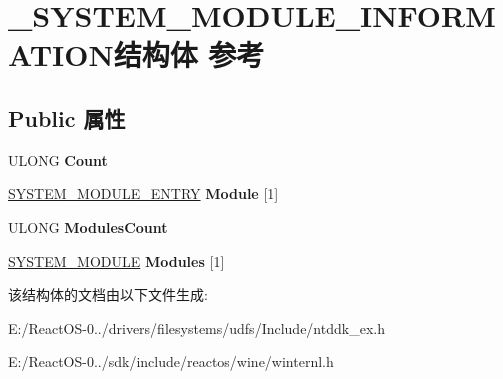 \hypertarget{struct___s_y_s_t_e_m___m_o_d_u_l_e___i_n_f_o_r_m_a_t_i_o_n}{}\section{\+\_\+\+S\+Y\+S\+T\+E\+M\+\_\+\+M\+O\+D\+U\+L\+E\+\_\+\+I\+N\+F\+O\+R\+M\+A\+T\+I\+O\+N结构体 参考}
\label{struct___s_y_s_t_e_m___m_o_d_u_l_e___i_n_f_o_r_m_a_t_i_o_n}
\subsection*{Public 属性}
\begin{DoxyCompactItemize}
\item 
\mbox{\label{struct___s_y_s_t_e_m___m_o_d_u_l_e___i_n_f_o_r_m_a_t_i_o_n_a2364a25229c26e8e7ca48a794c7d2bf2}} 
U\+L\+O\+NG {\bfseries Count}
\item 
\mbox{\label{struct___s_y_s_t_e_m___m_o_d_u_l_e___i_n_f_o_r_m_a_t_i_o_n_aa17ccbc5df4938996b20df197d03bd10}} 
\hyperlink{struct___s_y_s_t_e_m___m_o_d_u_l_e___e_n_t_r_y}{S\+Y\+S\+T\+E\+M\+\_\+\+M\+O\+D\+U\+L\+E\+\_\+\+E\+N\+T\+RY} {\bfseries Module} \mbox{[}1\mbox{]}
\item 
\mbox{\label{struct___s_y_s_t_e_m___m_o_d_u_l_e___i_n_f_o_r_m_a_t_i_o_n_a33af147d26d3425d850544dedf20220b}} 
U\+L\+O\+NG {\bfseries Modules\+Count}
\item 
\mbox{\label{struct___s_y_s_t_e_m___m_o_d_u_l_e___i_n_f_o_r_m_a_t_i_o_n_a2e33e4e1e81eb3c903eacb0ecf549cce}} 
\hyperlink{struct___s_y_s_t_e_m___m_o_d_u_l_e}{S\+Y\+S\+T\+E\+M\+\_\+\+M\+O\+D\+U\+LE} {\bfseries Modules} \mbox{[}1\mbox{]}
\end{DoxyCompactItemize}


该结构体的文档由以下文件生成\+:\begin{DoxyCompactItemize}
\item 
E\+:/\+React\+O\+S-\/0../drivers/filesystems/udfs/\+Include/ntddk\+\_\+ex.\+h\item 
E\+:/\+React\+O\+S-\/0../sdk/include/reactos/wine/winternl.\+h\end{DoxyCompactItemize}
